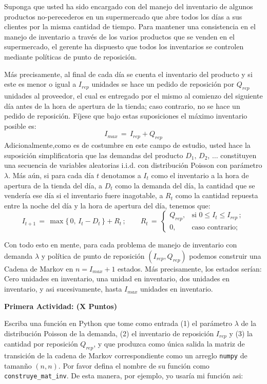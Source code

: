 \documentclass[ a4paper, twoside, 11pt]{article}
\begin{document}
\begin{problem}
Suponga que usted ha sido encargado con del manejo del inventario de algunos productos no-perecederos en un supermercado que abre todos los d\'ias a sus clientes por la misma cantidad de tiempo. Para mantener una consistencia en el manejo de inventario a trav\'es de los varios productos que se venden en el supermercado, el gerente ha dispuesto que todos los inventarios se controlen mediante pol\'iticas de punto de reposici\'on. 

M\'as precisamente, al final de cada d\'ia se cuenta el inventario del producto y si este es menor o igual a $I_{rep}$ unidades se hace un pedido de reposici\'on por $Q_{rep}$ unidades al proveedor, el cual es entregado por el mismo al comienzo del siguiente d\'ia antes de la hora de apertura de la tienda; caso contrario, no se hace un pedido de reposici\'on. F\'ijese que bajo estas suposiciones el m\'aximo inventario posible es:
\[
I_{max} \, = \, I_{rep} + Q_{rep}
\]
Adicionalmente,como es de costumbre en este campo de estudio, usted hace la suposici\'on simplificatoria que las demandas del producto $D_1, \, D_2, \, \dots$ constituyen una secuencia de variables aleatorias i.i.d. con distribuci\'on Poisson con par\'ametro $\lambda$. M\'as a\'un, si para cada d\'ia $t$ denotamos a $I_t$ como el inventario a la hora de apertura de la tienda del \tavo d\'ia, a $D_t$ como la demanda del d\'ia, \ie la cantidad que se vender\'ia ese d\'ia si el inventario fuere inagotable, a $R_t$ como la cantidad repuesta entre la noche del \tavo d\'ia y la hora de apertura del \tMavo d\'ia, tenemos que:
\[
I_{t+1} \, = \, \max \{ \, 0, \, I_t - D_t \, \} + R_t \, ; \qquad
R_t \, = \, 
\begin{cases}
Q_{rep}, & \text{si } 0 \leq I_t \leq I_{rep} \, ; \\
0, & \text{caso contrario;}
\end{cases}
\]

Con todo esto en mente, para cada problema de manejo de inventario con demanda $\lambda$ y pol\'itica de punto de reposici\'on $(I_{rep},Q_{rep})$ podemos construir una Cadena de Markov en $n = I_{max} + 1$ estados. M\'as precisamente, los estados ser\'ian: Cero unidades en inventario, una unidad en inventario, dos unidades en inventario, y asi sucesivamente, hasta $I_{max}$ unidades en inventario. 

\textbf{Primera Actividad: (X Puntos)}

Escriba una funci\'on en Python que tome como entrada (1) el par\'ametro $\lambda$ de la distribuci\'on Poisson de la demanda, (2) el inventario de reposici\'on $I_{rep}$ y (3) la cantidad por reposici\'on $Q_{rep}$, y que produzca como \'unica salida la matriz de transici\'on de la cadena de Markov correspondiente como un arreglo {\tt numpy} de taman\~no $(n,n)$. Por favor defina el nombre de su funci\'on como {\tt construye\_mat\_inv}. De esta manera, por ejemplo, yo usar\'ia mi funci\'on asi:
\halfskip


\end{problem}
\end{document}

